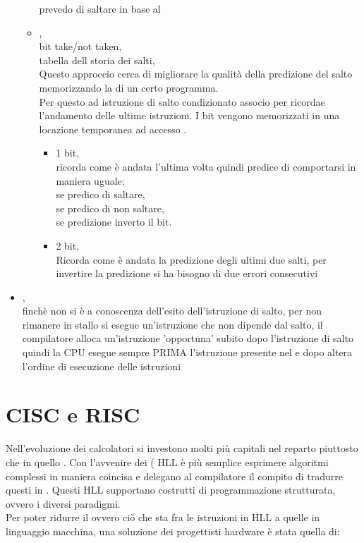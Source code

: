 \documentclass[arch.tex]{subfiles}
\begin{document}
\begin{itemize}
\begin{itemize}
				prevedo di saltare in base al  
			\item {},\\
				bit take/not taken,\\
				tabella dell storia dei salti,\\
				Questo approccio cerca di migliorare la qualità della 
				predizione del salto memorizzando la  di un certo programma.\\
				Per questo ad  istruzione di salto condizionato
				associo  per ricordae l'andamento delle ultime
				istruzioni. I bit vengono memorizzati in una locazione temporanea
				ad accesso .
				\begin{itemize}
					\item 1 bit,\\
						ricorda come è andata l'ultima volta quindi
						predice di comportarsi in maniera uguale:\\
						se  predico di saltare,\\
						se  predico di non saltare,\\
						se  predizione inverto il bit.
					\item 2 bit,\\
						Ricorda come è andata la predizione degli ultimi
						due salti, per invertire la predizione si 
						ha bisogno di due errori consecutivi
				\end{itemize}
		\end{itemize}
	\item {},\\
		finchè non si è a conoscenza dell'esito dell'istruzione di salto, per non
		rimanere in stallo si esegue un'istruzione che non dipende dal salto,
		il compilatore alloca un'istruzione 'opportuna' subito dopo l'istruzione 
		di salto quindi la CPU esegue sempre PRIMA l'istruzione presente nel 
		 e dopo altera l'ordine di esecuzione  delle istruzioni
\end{itemize}

\section{CISC e RISC}%
\label{sec:cisc_e_risc}

Nell'evoluzione dei calcolatori si investono molti più capitali nel reparto  
piuttosto che in quello . Con l'avvenire dei  ( HLL 
è più semplice esprimere algoritmi complessi in maniera coincisa e delegano al compilatore il 
compito di tradurre questi in . Questi HLL supportano costrutti
di programmazione strutturata, ovvero i diversi paradigmi.\\
Per poter ridurre il  ovvero ciò che sta fra le istruzioni in HLL a quelle
in linguaggio macchina, una soluzione dei progettisti hardware è stata quella di:
\end{document}
